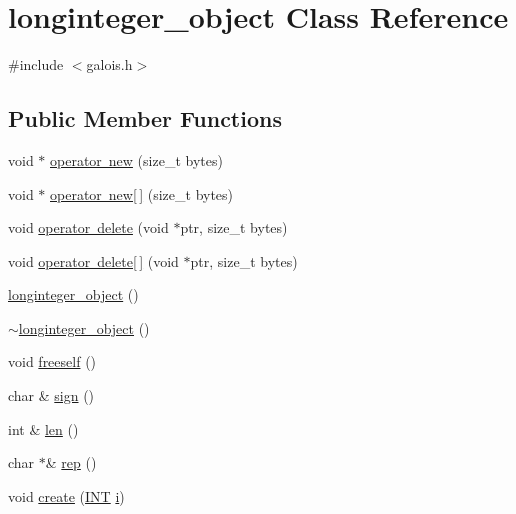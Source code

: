 \hypertarget{classlonginteger__object}{}\section{longinteger\+\_\+object Class Reference}
\label{classlonginteger__object}


{\ttfamily \#include $<$galois.\+h$>$}

\subsection*{Public Member Functions}
\begin{DoxyCompactItemize}
\item 
void $\ast$ \mbox{\hyperlink{classlonginteger__object_ad2e655fc8c1d123b2ff97edac279aca1}{operator new}} (size\+\_\+t bytes)
\item 
void $\ast$ \mbox{\hyperlink{classlonginteger__object_a1d8b2cfd66ce5aab50a6f7a3cdcb3faf}{operator new\mbox{[}$\,$\mbox{]}}} (size\+\_\+t bytes)
\item 
void \mbox{\hyperlink{classlonginteger__object_a05ab8483b8d51a86eb1f3d8f14b8bbeb}{operator delete}} (void $\ast$ptr, size\+\_\+t bytes)
\item 
void \mbox{\hyperlink{classlonginteger__object_a09b247055fc20779ac24e05f9178bba1}{operator delete\mbox{[}$\,$\mbox{]}}} (void $\ast$ptr, size\+\_\+t bytes)
\item 
\mbox{\hyperlink{classlonginteger__object_abea190e16f9791558f40b41113b3ae4e}{longinteger\+\_\+object}} ()
\item 
\mbox{\hyperlink{classlonginteger__object_a5ff2f8430abfa5e8728d204379577d53}{$\sim$longinteger\+\_\+object}} ()
\item 
void \mbox{\hyperlink{classlonginteger__object_a06450f8c4795d81da6d680830ef958a1}{freeself}} ()
\item 
char \& \mbox{\hyperlink{classlonginteger__object_ab69549d0bd669e44d776f14ab1a0a344}{sign}} ()
\item 
int \& \mbox{\hyperlink{classlonginteger__object_a0bfeae35be8a6fd44ed7f76413596ab1}{len}} ()
\item 
char $\ast$\& \mbox{\hyperlink{classlonginteger__object_a3ecaf12738cc721d281c416503f241e2}{rep}} ()
\item 
void \mbox{\hyperlink{classlonginteger__object_a95d2eebc60849c3963a49298b1f498c2}{create}} (\mbox{\hyperlink{galois_8h_a09fddde158a3a20bd2dcadb609de11dc}{I\+NT}} \mbox{\hyperlink{alphabet2_8_c_acb559820d9ca11295b4500f179ef6392}{i}})

\end{DoxyCompactItemize}
